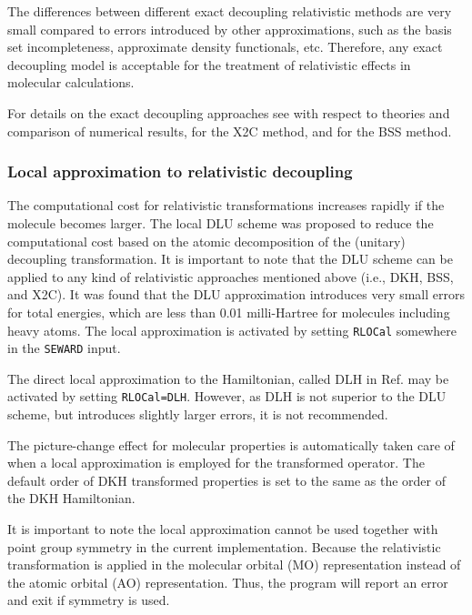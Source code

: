 The differences between different exact decoupling relativistic methods are very small compared
to errors introduced by other approximations, such as the basis set incompleteness, approximate
density functionals, etc. Therefore, any exact decoupling model is acceptable for the
treatment of relativistic effects in molecular calculations.

For details on the exact decoupling approaches see \cite{R2C_review} with respect to theories and
comparison of numerical results, \cite{X2C_kut05jcp,X2C_liu06jcp,X2C_pen07jcp} for the X2C method, and
\cite{BSS_bar97ijqc,BSS_ked07cpl} for the BSS method.

\subsubsection{Local approximation to relativistic decoupling}

The computational cost for relativistic transformations increases rapidly if the molecule becomes
larger. The local DLU scheme \cite{DLU_Theory} was proposed to reduce the computational cost
based on the atomic decomposition of the (unitary) decoupling transformation.  It is important to note that
the DLU scheme can be applied to any kind of relativistic approaches mentioned above (i.e., DKH, BSS, and X2C). It was found \cite{DLU_Theory}
that the DLU approximation introduces very small errors for total energies, which are less than
0.01 milli-Hartree for molecules including heavy atoms.
The local approximation is activated by setting {\tt RLOCal} somewhere in the {\tt SEWARD} input.

The direct local approximation to the Hamiltonian, called DLH in Ref.  \cite{DLU_Theory} may be activated by setting {\tt RLOCal=DLH}.
However, as DLH is not superior to the DLU scheme, but introduces slightly larger errors, it is not recommended.

The picture-change effect for molecular properties is automatically taken care of when a local approximation is employed for the transformed
operator. The default order of DKH transformed properties is set to the same as the order of the DKH Hamiltonian.

It is important to note the local approximation cannot be used together with point group symmetry
in the current implementation. Because the relativistic transformation is applied in the molecular
orbital (MO) representation instead of the atomic orbital (AO) representation. Thus, the program will
report an error and exit if symmetry is used.

